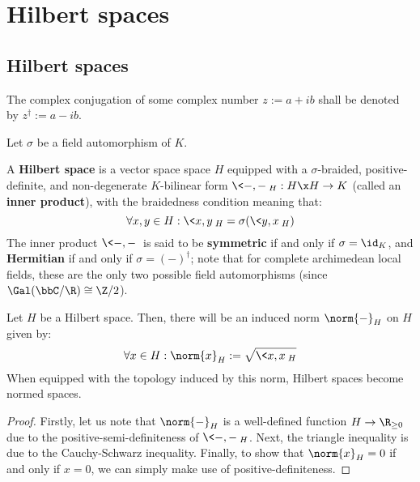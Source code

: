\section{Hilbert spaces} \label{section: hilbert_spaces}
    \subsection{Hilbert spaces}
        \begin{convention}
            The complex conjugation of some complex number $z := a + ib$ shall be denoted by $z^{\dagger} := a - ib$.
        \end{convention}
    
        \begin{definition} \label{def: hilbert_spaces}
            Let $\sigma$ be a field automorphism of $K$.
        
            A \textbf{Hilbert space} is a vector space space $H$ equipped with a $\sigma$-braided, positive-definite, and non-degenerate $K$-bilinear form $\<-, -\>_H: H \x H \to K$ (called an \textbf{inner product}), with the braidedness condition meaning that:
                $$\forall x, y \in H: \<x, y\>_H = \sigma( \<y, x\>_H )$$
            The inner product $\<-, -\>$ is said to be \textbf{symmetric} if and only if $\sigma = \id_K$, and \textbf{Hermitian} if and only if $\sigma = (-)^{\dagger}$; note that for complete archimedean local fields, these are the only two possible field automorphisms (since $\Gal(\bbC/\R) \cong \Z/2$). 
        \end{definition}
        \begin{proposition} \label{prop: induced_norms_on_hilbert_spaces}
            Let $H$ be a Hilbert space. Then, there will be an induced norm $\norm{-}_H$ on $H$ given by:
                $$\forall x \in H: \norm{x}_H := \sqrt{\<x, x\>_H}$$
            When equipped with the topology induced by this norm, Hilbert spaces become normed spaces. 
        \end{proposition}
            \begin{proof}
                Firstly, let us note that $\norm{-}_H$ is a well-defined function $H \to \R_{\geq 0}$ due to the positive-semi-definiteness of $\<-, -\>_H$. Next, the triangle inequality is due to the Cauchy-Schwarz inequality. Finally, to show that $\norm{x}_H = 0$ if and only if $x = 0$, we can simply make use of positive-definiteness.
            \end{proof}

